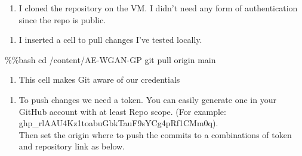 \documentclass[
  letterpaper,
  DIV=11,
  numbers=noendperiod]{scrreprt}
\newenvironment{Shaded}{\begin{snugshade}}{\end{snugshade}}
\newcommand{\KeywordTok}[1]{\textcolor[rgb]{0.00,0.23,0.31}{#1}}
\newcommand{\NormalTok}[1]{\textcolor[rgb]{0.00,0.23,0.31}{#1}}
\newcommand{\OperatorTok}[1]{\textcolor[rgb]{0.37,0.37,0.37}{#1}}
\providecommand{\tightlist}{%
  \setlength{\itemsep}{0pt}\setlength{\parskip}{0pt}}\usepackage{longtable,booktabs,array}
\begin{document}
\begin{enumerate}
\def\labelenumi{\arabic{enumi}.}
\setcounter{enumi}{1}
\tightlist
\item
  I cloned the repository on the VM. I didn't need any form of
  authentication since the repo is public.
\end{enumerate}

\begin{Shaded}
\end{Shaded}

\begin{enumerate}
\def\labelenumi{\arabic{enumi}.}
\setcounter{enumi}{2}
\tightlist
\item
  I inserted a cell to pull changes I've tested locally.
\end{enumerate}

\begin{Shaded}
\begin{Highlighting}[]
\OperatorTok{\%\%}\NormalTok{bash}
\NormalTok{cd }\OperatorTok{/}\NormalTok{content}\OperatorTok{/}\NormalTok{AE}\OperatorTok{{-}}\NormalTok{WGAN}\OperatorTok{{-}}\NormalTok{GP}
\NormalTok{git pull origin main}
\end{Highlighting}
\end{Shaded}

\begin{enumerate}
\def\labelenumi{\arabic{enumi}.}
\setcounter{enumi}{3}
\tightlist
\item
  This cell makes Git aware of our credentials
\end{enumerate}

\begin{Shaded}
\end{Shaded}

\begin{enumerate}
\def\labelenumi{\arabic{enumi}.}
\setcounter{enumi}{4}
\tightlist
\item
  To push changes we need a token. You can easily generate one in your
  GitHub account with at least Repo scope. (For example:
  ghp\_rlAAU4Kz1toabuGbkTauF9sYCg4pRf1CMm0q).\\
  Then set the origin where to push the commits to a combinations of
  token and repository link as below.
\end{enumerate}
\end{document}
